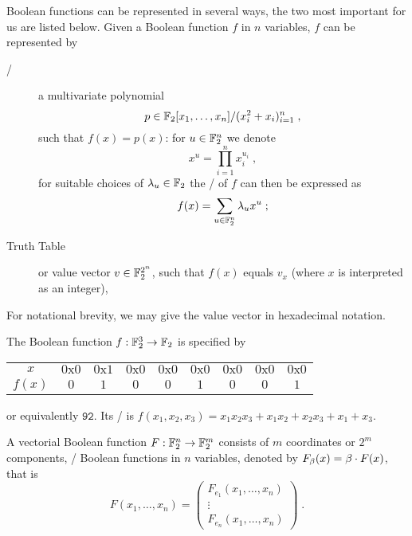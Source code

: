 Boolean functions can be represented in several ways, the two most important for us are listed below.
Given a Boolean function $f$ in $n$ variables, $f$ can be represented by
\begin{description}
    \item[\ANF/] a multivariate polynomial
                 \begin{equation*}
                     p \in \mathbb{F}_2[x_1, \ldots, x_n]/(x_i^2 + x_i)_{i=1}^n\;,
                 \end{equation*}
                 such that $f(x) = p(x)$:
                 for $u \in \mathbb{F}_2^n$ we denote
                 \begin{equation*}
                     x^u = \prod_{i=1}^{n} x_i^{u_i}\;,
                 \end{equation*}
                 for suitable choices of $\lambda_u \in \mathbb{F}_2$ the \ANF/ of $f$ can then be expressed as
                 \begin{equation*}
                     f(x) = \sum_{u \in \mathbb{F}_2^n} \lambda_u x^u\;;
                 \end{equation*}
    \item[Truth Table] or value vector $v \in \mathbb{F}_2^{2^n}$, such that $f(x)$ equals $v_x$ (where $x$ is interpreted as an integer),
\end{description}
For notational brevity, we may give the value vector in hexadecimal notation.
\begin{example}
    The Boolean function $f : \mathbb{F}_2^3 \to \mathbb{F}_2$ is specified by
    \begin{center}
    \begin{tabular}{ccccccccc}
        \toprule
        $x$ & $\mathrm{0x0}$ & $\mathrm{0x1}$ & $\mathrm{0x0}$ & $\mathrm{0x0}$ & $\mathrm{0x0}$ & $\mathrm{0x0}$ & $\mathrm{0x0}$ & $\mathrm{0x0}$ \\
        $f(x)$ & $0$ & $1$ & $0$ & $0$ & $1$ & $0$ & $0$ & $1$ \\
        \bottomrule
    \end{tabular}
    \end{center}
    or equivalently $\mathtt{92}$.
    Its \ANF/ is $f(x_1, x_2, x_3) = x_1 x_2 x_3 + x_1 x_2 + x_2 x_3 + x_1 + x_3$.
\end{example}
A vectorial Boolean function $F : \mathbb{F}_2^n \to \mathbb{F}_2^m$ consists of $m$ coordinates or $2^m$ components, \ie/ Boolean functions in $n$ variables, denoted by $F_{\beta}(x) = \beta \cdot F(x)$, that is
\begin{equation*}
    F(x_1, \ldots, x_n) = \begin{pmatrix}
        F_{e_1}(x_1, \ldots, x_n) \\
        \vdots                    \\
        F_{e_n}(x_1, \ldots, x_n)
    \end{pmatrix}\;.
\end{equation*}

